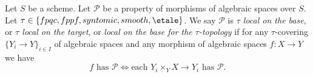 \begin{definition}
\label{definition-property-morphisms-local}
Let $S$ be a scheme.
Let $\mathcal{P}$ be a property of morphisms of algebraic spaces over $S$.
Let $\tau \in \{fpqc, fppf, syntomic, smooth, \etale\}$.
We say $\mathcal{P}$ is {\it $\tau$ local on the base}, or
{\it $\tau$ local on the target}, or
{\it local on the base for the $\tau$-topology} if for any
$\tau$-covering $\{Y_i \to Y\}_{i \in I}$ of algebraic spaces
and any morphism of algebraic spaces $f : X \to Y$ we
have
$$
f \text{ has }\mathcal{P}
\Leftrightarrow
\text{each }Y_i \times_Y X \to Y_i\text{ has }\mathcal{P}.
$$
\end{definition}